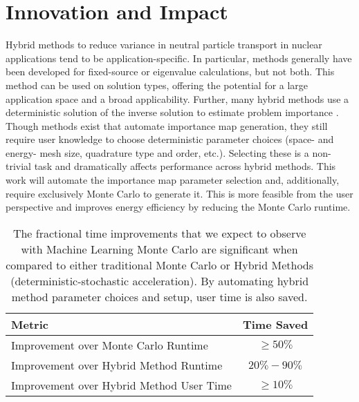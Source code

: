 \documentclass[letterpaper,12pt]{article}
\begin{document}
\section{Innovation and Impact}
Hybrid methods to reduce variance in neutral particle transport in nuclear
applications tend to be application-specific. In particular, methods generally
have been developed for fixed-source or eigenvalue calculations, but not both.
This method can be used on solution types, offering the potential for
a large application space and a broad applicability. Further, many hybrid
methods use a deterministic solution of the inverse solution to estimate problem
importance\cite{wagner_automated_1998, wagner_automated_2009,
haghighat_monte_2003, zhang_adjoint-based_2011, hoogenboom_optimum_1979} . Though methods exist that automate importance map
generation\cite{hendricks_mcnp_1985, burn_optimizing_2014,
  van_wijk_easy_2011, wagner_automated_1998, wagner_automated_2009,
haghighat_monte_2003, zhang_adjoint-based_2011, hoogenboom_optimum_1979},
they still require user knowledge to choose deterministic
parameter choices (space- and energy- mesh size, quadrature type and order,
etc.). Selecting these is a non-trivial task and dramatically affects performance
across hybrid methods. This work will automate the importance map parameter selection
and, additionally, require exclusively Monte Carlo to generate it. This is more
feasible from the user perspective and improves energy efficiency by reducing
the Monte Carlo runtime.
\FloatBarrier

\begin{table}
  \centering
    \begin{tabular}{  l  c  }
     \hline
     \textbf{Metric} & \textbf{Time Saved}\\ \hline
     Improvement over Monte Carlo Runtime & $\ge50\%$  \\
     Improvement over Hybrid Method Runtime & $20\%-90\%$ \\
     Improvement over Hybrid Method User Time & $\ge10\%$ \\
     \hline
    \end{tabular}
    \caption{The fractional time improvements that we expect  to observe with Machine 
            Learning Monte Carlo are significant when compared to either 
            traditional Monte Carlo or Hybrid Methods (deterministic-stochastic 
            acceleration). By automating hybrid method parameter choices and setup, 
    user time is also saved.}
   \label{tab:improve}
\end{table}
\end{document}
